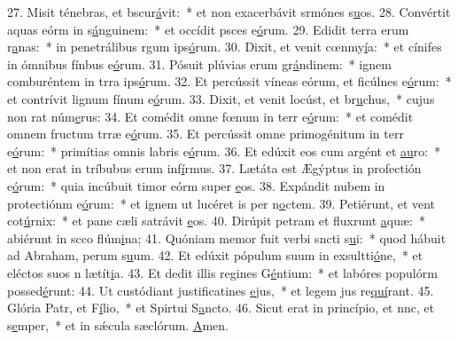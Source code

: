 27. Misit ténebras, et bscur\uline{á}vit:~* et non exacerbávit srmónes s\uline{u}os.
28. Convértit aquas eórm in s\uline{á}nguinem:~* et occídit psces e\uline{ó}rum.
29. Edidit terra erum r\uline{a}nas:~* in penetrálibus rgum ips\uline{ó}rum.
30. Dixit, et venit cœnmy\uline{í}a:~* et cínifes in ómnibus fínbus e\uline{ó}rum.
31. Pósuit plúvias erum gr\uline{á}ndinem:~* ignem comburéntem in trra ips\uline{ó}rum.
32. Et percússit víneas eórum, et ficúlnes e\uline{ó}rum:~* et contrívit lignum fínum e\uline{ó}rum.
33. Dixit, et venit locúst, et br\uline{u}chus,~* cujus non rat núm\uline{e}rus:
34. Et comédit omne fœnum in terr e\uline{ó}rum:~* et comédit omnem fructum trræ e\uline{ó}rum.
35. Et percússit omne primogénitum in terr e\uline{ó}rum:~* primítias omnis labris e\uline{ó}rum.
36. Et edúxit eos cum argént et \uline{au}ro:~* et non erat in tríbubus erum inf\uline{í}rmus.
37. Lætáta est Ægýptus in profectión e\uline{ó}rum:~* quia incúbuit timor eórm super \uline{e}os.
38. Expándit nubem in protectiónm e\uline{ó}rum:~* et ignem ut lucéret is per n\uline{o}ctem.
39. Petiérunt, et vent cot\uline{ú}rnix:~* et pane cæli satrávit \uline{e}os.
40. Dirúpit petram et fluxrunt \uline{a}quæ:~* abiérunt in scco flúm\uline{i}na;
41. Quóniam memor fuit verbi sncti s\uline{u}i:~* quod hábuit ad Abraham, perum s\uline{u}um.
42. Et edúxit pópulum suum in exsultti\uline{ó}ne,~* et eléctos suos n lætít\uline{i}a.
43. Et dedit illis regines G\uline{é}ntium:~* et labóres populórm possed\uline{é}runt:
44. Ut custódiant justificatines \uline{e}jus,~* et legem jus re\uline{quí}rant.
45. Glória Patr, et F\uline{í}lio,~* et Spirtui S\uline{a}ncto.
46. Sicut erat in princípio, et nnc, et s\uline{e}mper,~* et in sǽcula sæclórum. \uline{A}men.
